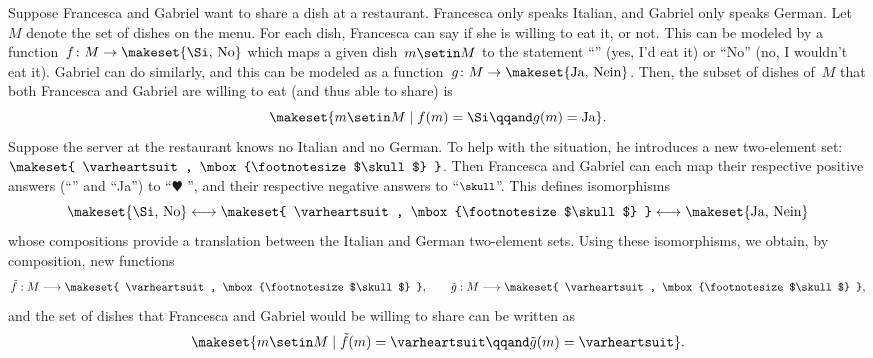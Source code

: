{\begin{example}
    Suppose Francesca and Gabriel want to share a dish at a restaurant.
    Francesca only speaks Italian, and Gabriel only speaks German.
    Let~$M$ denote the set of dishes on the menu.
    For each dish, Francesca can say if she is willing to eat it, or not.
    This can be modeled by a function~$f\colon M \to \makeset{ \text{\Si, No} }$ which maps a given dish~$m \setin M$ to the statement ``\Si'' (yes, I'd eat it) or ``No'' (no, I wouldn't eat it).
    Gabriel can do similarly, and this can be modeled as a function~$g\colon M \to \makeset{ \text{Ja, Nein} }$.
    Then, the subset of dishes of~$M$ that both Francesca and Gabriel are willing to eat (and thus able to share) is
    \begin{equation}
        \makeset{ m \setin M \mid f(m) = \text{\Si} \qqand g(m) = \text{Ja} }.
    \end{equation}
    Suppose the server at the restaurant knows no Italian and no German.
    To help with the situation, he introduces a new two-element set: $\makeset{ \varheartsuit, \mbox{\footnotesize $\skull$} }$.
    Then Francesca and Gabriel can each map their respective positive answers (``\Si'' and ``Ja'') to ``$\varheartsuit$ '', and their respective negative answers to ``$\mbox{\footnotesize $\skull$}$''.
    This defines isomorphisms
    \begin{equation}
        \makeset{ \text{\Si, No} } \longleftrightarrow \makeset{ \varheartsuit, \mbox{\footnotesize $\skull$} } \longleftrightarrow \makeset{ \text{Ja, Nein} }
    \end{equation}
    whose compositions provide a translation between the Italian and German two-element sets.
    Using these isomorphisms, we obtain, by composition, new functions
    \begin{equation}
        \tilde f: M \longrightarrow \makeset{ \varheartsuit, \mbox{\footnotesize $\skull$} }, \qquad \tilde g: M \longrightarrow \makeset{ \varheartsuit, \mbox{\footnotesize $\skull$} },
    \end{equation}
    and the set of dishes that Francesca and Gabriel would be willing to share can be written as
    \begin{equation}
        \makeset{ m \setin M \mid \tilde f(m) = \varheartsuit \qqand \tilde g(m) = \varheartsuit }.
    \end{equation}


\end{example}}
